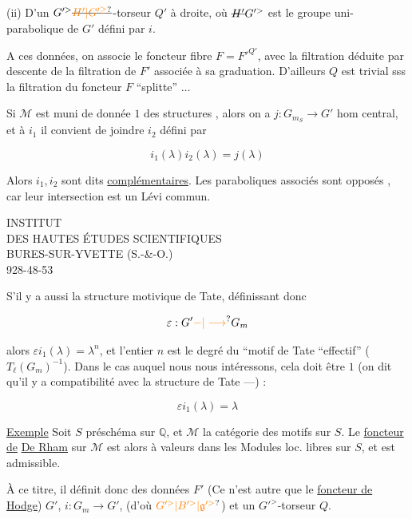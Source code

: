 (ii) D'un $G'^{>}\deleted{\unsure{H'|G'^{\geq}}}$-torseur  $Q'$ à droite, où $\deleted{H'}G'^{>}$  est le  groupe uni-parabolique de $G'$ défini par $i$.

A ces données, on associe le foncteur fibre $F=F'^{Q'}$, avec la filtration déduite par descente de la filtration  de $F'$  associée  à sa graduation. D'ailleurs $Q$ est trivial sss la filtration du foncteur $F$ ``splitte'' $\ldots$

Si $\mathcal M$ est muni de  donnée  $1$ des structures ,  alors on a $j:G_{m_S}\longrightarrow G'$ hom central, et à $i_1$ il convient de joindre $i_2$ défini par

\[
i_1(\lambda)i_2(\lambda)=j(\lambda)
\]

Alors $i_1,i_2$ sont dits \uline{complémentaires}. Les paraboliques associés sont opposés , car leur intersection est un Lévi commun.

INSTITUT\\
DES HAUTES ÉTUDES SCIENTIFIQUES\\
BURES-SUR-YVETTE (S.-\&-O.)\\
928-48-53

S'il y a aussi la structure motivique de Tate, définissant donc

\[
\varepsilon:G'\unsure{-|\longrightarrow}G_m
\]

alors $\varepsilon i_1(\lambda)=\lambda^n$, et l'entier $n$ est le degré du  ``motif de Tate ``effectif'' ( $T_{\ell}(G_m)^{-1}$). Dans le cas auquel nous nous intéressons, cela doit être $1$ (on dit qu'il y a compatibilité avec la structure de Tate ---) :

\[
\varepsilon i_1(\lambda)=\lambda
\]

\uline{Exemple} Soit $S$ préschéma  sur $\mathbb Q$,  et $\mathcal M$ la catégorie des motifs sur $S$. Le \uline{foncteur de} \uline{De Rham} sur $\mathcal M$ est alors à valeurs dans les Modules loc. libres sur $S$, et est admissible.

À ce titre, il définit donc des données $F'$ (Ce n'est autre que le \uline{foncteur de Hodge})  $G'$, $i:G_m\longrightarrow G'$, (d'où $\unsure{G'^{>}|B'^{>}|\mathfrak g'^{>}}$) et un $G'^{>}$-torseur $Q$.

